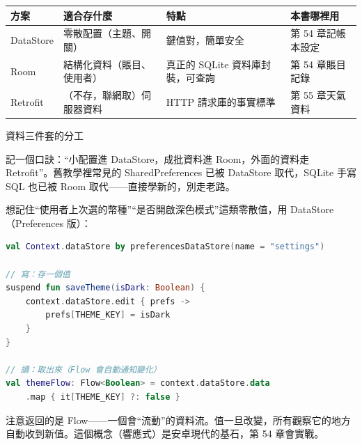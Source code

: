 


\begin{center}
\begin{tabularx}{\linewidth}{|X|X|X|X|}
\hline
\textbf{方案} & \textbf{適合存什麼} & \textbf{特點} & \textbf{本書哪裡用} \tabularnewline
\hline
DataStore & 零散配置（主題、開關） & 鍵值對，簡單安全 & 第 54 章記帳本設定 \tabularnewline
Room & 結構化資料（賬目、使用者） & 真正的 SQLite 資料庫封裝，可查詢 & 第 54 章賬目記錄 \tabularnewline
Retrofit & （不存，聯網取）伺服器資料 & HTTP 請求庫的事實標準 & 第 55 章天氣資料 \tabularnewline
\hline
\end{tabularx}
\end{center}

\begin{center}\small\color{gray}資料三件套的分工\end{center}

記一個口訣：“小配置進 DataStore，成批資料進 Room，外面的資料走 Retrofit”。舊教學裡常見的 SharedPreferences 已被 DataStore 取代，SQLite 手寫 SQL 也已被 Room 取代——直接學新的，別走老路。


想記住“使用者上次選的幣種”“是否開啟深色模式”這類零散值，用 DataStore（Preferences 版）：

\begin{lstlisting}[language=Kotlin]
val Context.dataStore by preferencesDataStore(name = "settings")

// 寫：存一個值
suspend fun saveTheme(isDark: Boolean) {
    context.dataStore.edit { prefs ->
        prefs[THEME_KEY] = isDark
    }
}

// 讀：取出來（Flow 會自動通知變化）
val themeFlow: Flow<Boolean> = context.dataStore.data
    .map { it[THEME_KEY] ?: false }
\end{lstlisting}

注意返回的是 Flow——一個會“流動”的資料流。值一旦改變，所有觀察它的地方自動收到新值。這個概念（響應式）是安卓現代的基石，第 54 章會實戰。


